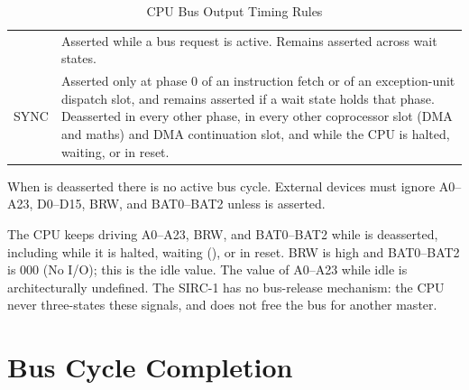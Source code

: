 \begin{table}[H]
\begin{tabularx}{\textwidth}{lX}
		\activelow{BAS} & Asserted while a bus request is active. Remains asserted across wait states.                                                                                                                                                                                                                                  \\
		SYNC            & Asserted only at phase 0 of an instruction fetch or of an exception-unit dispatch slot, and remains asserted if a wait state holds that phase. Deasserted in every other phase, in every other coprocessor slot (DMA and maths) and DMA continuation slot, and while the CPU is halted, waiting, or in reset. \\
		\bottomrule
	\end{tabularx}
	\caption{CPU Bus Output Timing Rules}
	\label{tab:bus-output-timing-rules}
\end{table}

When  is deasserted there is no active bus cycle. External devices must ignore A0--A23, D0--D15, BRW,
and BAT0--BAT2 unless  is asserted.

The CPU keeps driving A0--A23, BRW, and BAT0--BAT2 while  is deasserted, including while it is halted,
waiting (), or in reset. BRW is high and BAT0--BAT2 is 000 (No I/O); this is the idle value. The value
of A0--A23 while idle is architecturally undefined. The SIRC-1 has no bus-release mechanism: the CPU never three-states
these signals, and  does not free the bus for another master.

\section{Bus Cycle Completion}

